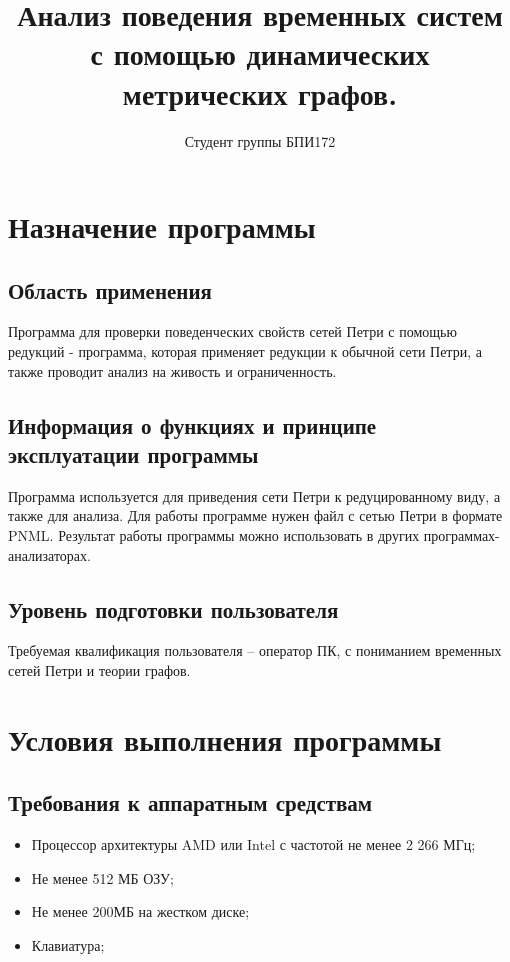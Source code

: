 \documentclass{../TechDoc}
\title{Анализ поведения временных систем с помощью динамических метрических графов.}
\author{Студент группы БПИ172}{А. А. Измайлов}
\begin{document}
	\maketitle
	\tableofcontents
	
	\section{Назначение программы}
	\subsection{Область применения}
	Программа для проверки поведенческих свойств сетей Петри с помощью редукций - программа, которая применяет редукции к обычной сети Петри, а также проводит анализ на живость и ограниченность.
	
	\subsection{Информация о функциях и принципе эксплуатации программы}
	Программа используется для приведения сети Петри к редуцированному виду, а также для анализа. Для работы программе нужен файл с сетью Петри в формате PNML. Результат работы программы можно использовать в других программах-анализаторах.
	
	\subsection{Уровень подготовки пользователя}
	Требуемая квалификация пользователя – оператор ПК, с пониманием временных сетей Петри и теории графов.
	
	\section{Условия выполнения программы}
	\subsection{Требования к аппаратным средствам}
	\begin{itemize}
		\item Процессор архитектуры AMD или Intel с частотой не менее 2 266 МГц;
		\item Не менее 512 МБ ОЗУ;
		\item Не менее 200МБ на жестком диске;
		\item Клавиатура;
	\end{itemize}
	
\end{document}
